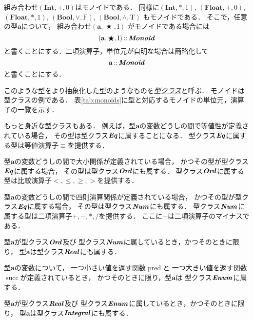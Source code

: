 \documentclass[a5paper,draft]{jsbook}
\newcommand{\keyword}[1]{{\underline{\emph{#1}}}}
\newcommand{\mathConstant}[1]{\mathrm{#1}} %
\newcommand{\mathTypeParameter}[1]{\mathbf{#1}}
\newcommand{\mathTypeName}[1]{\textbf{#1}}
\newcommand{\mathTypeClass}[1]{\textbf{\emph{#1}}} %
\newcommand{\mathTupleWith}[1]{\left(#1\right)}
\newcommand{\mathFalse}{\mathConstant{F}}
\newcommand{\mathTrue}{\mathConstant{T}}
\DeclareMathOperator{\mathPred}{pred}
\DeclareMathOperator{\mathSucc}{succ}
\newcommand{\mathBinaryOperator}[1]{\operatorname{#1}}
\newcommand{\mathAnyBinaryOperator}{\mathBinaryOperator{\bigstar}}
\newcommand{\mathIn}{\mathBinaryOperator{:\!:}}
\newcommand{\mathMonoid}[3]{(#1,#2,#3)}
\newcommand{\hsklBool}{\mathTypeParameter{Bool}}
\newcommand{\hsklFloat}{\mathTypeParameter{Float}}
\begin{document}
組み合わせ$\mathMonoid{\mathTypeName{Int}}{+}{0}$はモノイドである．
同様に$\mathMonoid{\mathTypeName{Int}}{*}{1}$,
$\mathMonoid{\hsklFloat}{+}{0}$,
$\mathMonoid{\hsklFloat}{*}{1}$,
$\mathMonoid{\hsklBool}{\vee}{\mathFalse}$,
$\mathMonoid{\hsklBool}{\wedge}{\mathTrue}$ もモノイドである．
そこで，任意の型$\mathTypeParameter{a}$について，
組み合わせ$\mathTupleWith{\mathTypeParameter{a},\mathAnyBinaryOperator,\mathConstant{I}}$
がモノイドである場合には
\begin{equation}
\mathTupleWith{\mathTypeParameter{a},\mathAnyBinaryOperator,\mathConstant{I}}\mathIn\mathTypeClass{Monoid}
\end{equation}
と書くことにする．二項演算子，単位元が自明な場合は簡略化して
\begin{equation}
\mathTypeParameter{a}\mathIn\mathTypeClass{Monoid}
\end{equation}
と書くことにする．

このような型をより抽象化した型のようなものを\keyword{型クラス}と呼ぶ．
モノイドは型クラスの例である．
表\ref{tab:monoids}に型と対応するモノイドの単位元，演算子の一覧を示す．

もっと身近な型クラスもある．
例えば，型$\mathTypeParameter{a}$の変数どうしの間で等値性が定義されている場合，
その型は型クラス$\mathTypeClass{Eq}$に属することになる．
型クラス$\mathTypeClass{Eq}$に属する型は等値演算子$\equiv$を提供する．

型$\mathTypeParameter{a}$の変数どうしの間で大小関係が定義されている場合，
かつその型が型クラス$\mathTypeClass{Eq}$に属する場合，
その型は型クラス$\mathTypeClass{Ord}$にも属する．
型クラス$\mathTypeClass{Ord}$に属する型は比較演算子$<,\le,\ge,>$を提供する．

型$\mathTypeParameter{a}$の変数どうしの間で四則演算関係が定義されている場合，
かつその型が型クラス$\mathTypeClass{Eq}$に属する場合，
その型は型クラス$\mathTypeClass{Num}$にも属する．
型クラス$\mathTypeClass{Num}$に属する型は二項演算子$+,-,*,/$を提供する．
ここに$-$は二項演算子のマイナスである．

型$\mathTypeParameter{a}$が型クラス$\mathTypeClass{Ord}$及び
型クラス$\mathTypeClass{Num}$に属しているとき，かつそのときに限り，
型$\mathTypeParameter{a}$は型クラス$\mathTypeClass{Real}$にも属する．

型$\mathTypeParameter{a}$の変数について，
一つ小さい値を返す関数$\mathPred$と
一つ大きい値を返す関数$\mathSucc$が定義されているとき，
かつそのときに限り，型$\mathTypeParameter{a}$は
型クラス$\mathTypeClass{Enum}$に属する．

型$\mathTypeParameter{a}$が型クラス$\mathTypeClass{Real}$及び
型クラス$\mathTypeClass{Enum}$に属しているとき，かつそのときに限り，
型$\mathTypeParameter{a}$は型クラス$\mathTypeClass{Integral}$にも属する．
\end{document}
